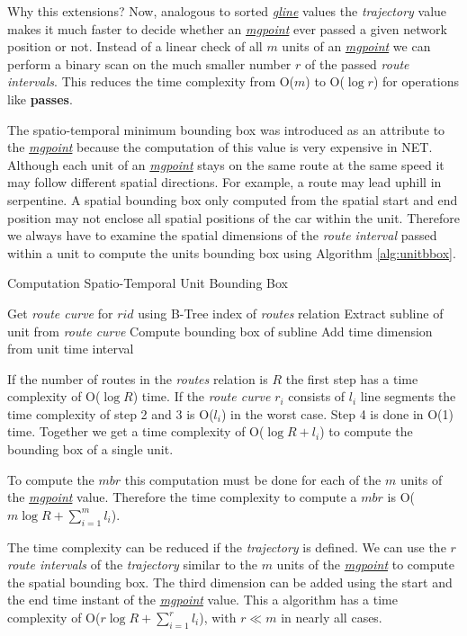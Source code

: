 \documentclass[a4paper]{article}
\newcommand{\op}[1]{\textbf{#1}}
\newcommand{\dt}[1]{\textsl{\underline{#1}}}
\begin{document}
Why this extensions?
Now, analogous to sorted \dt{gline} values the \textit{trajectory} value makes it much
faster to decide whether an \dt{mgpoint} ever passed a given network position or
not. Instead of a linear check of all $m$ units of an \dt{mgpoint} we can
perform
a binary scan on the much smaller number $r$ of the passed \textit{route
intervals}.
This reduces the time complexity from O($m$) to O($\log r$) for operations
like \op{passes}.

The spatio-temporal minimum bounding box was introduced as an attribute to the
\dt{mgpoint} because the computation of this value is very expensive in NET.
Although each unit of an \dt{mgpoint} stays on the same route
at the same speed it may follow different spatial directions. For example, a
route may lead uphill in serpentine. A spatial bounding box only computed from
the spatial start and end position may not enclose all spatial positions of the
car within the unit. Therefore we always have to examine the spatial dimensions
of the \textit{route interval} passed within a unit to compute the units
bounding box
using Algorithm \ref{alg:unitbbox}.
\begin{algorithm}[H]
  \caption{Computation Spatio-Temporal Unit Bounding Box}
  \label{alg:unitbbox}
  \begin{algorithmic}[1]
    \STATE Get \textit{route curve} for $rid$ using B-Tree index of \textit{routes}
relation
    \STATE Extract subline of unit from \textit{route curve}
    \STATE Compute bounding box of subline
    \STATE Add time dimension from unit time interval
  \end{algorithmic}
\end{algorithm}
If the number of routes in the \textit{routes} relation is $R$ the first step has a
time complexity of O($\log R$) time. If the \textit{route curve} $r_i$ consists
of $l_i$
line segments the time complexity of step 2 and 3 is O($l_i$) in the worst case.
Step 4 is done in O(1) time. Together we get a time complexity of
O($\log {R} + l_i$) to compute the bounding box of a single unit.

To compute the $mbr$ this computation must be done for each of the $m$ units of
the \dt{mgpoint} value. Therefore the time complexity to compute a $mbr$ is
O($m \log {R} + \sum_{i=1}^{m}{l_i}$).

The time complexity can be reduced if the \textit{trajectory} is defined. We can use
the $r$ \textit{route intervals} of the \textit{trajectory} similar to the $m$ units of
the \dt{mgpoint} to compute the spatial bounding box. The third dimension can be
added using the start and the end time instant of the \dt{mgpoint} value. This a
algorithm has a time complexity of O($r \log {R} + \sum_{i=1}^{r}{l_i}$), with
$r \ll m$ in nearly all cases.
\end{document}
